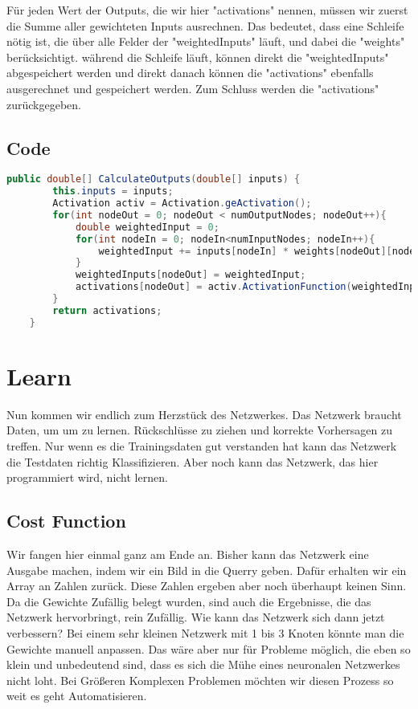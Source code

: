 \documentclass[12pt]{article}
\begin{document}
Für jeden Wert der Outputs, die wir hier "activations" nennen, müssen wir zuerst die Summe aller gewichteten Inputs ausrechnen. Das bedeutet, dass eine Schleife nötig ist, die über alle Felder der "weightedInputs" läuft, und dabei die "weights" berücksichtigt. während die Schleife läuft, können direkt die "weightedInputs" abgespeichert werden und direkt danach können die "activations" ebenfalls ausgerechnet und gespeichert werden. Zum Schluss werden die "activations" zurückgegeben.\subsection{ Code}\begin{lstlisting}[language=Java]
    public double[] CalculateOutputs(double[] inputs) {
        this.inputs = inputs;
        Activation activ = Activation.geActivation();
        for(int nodeOut = 0; nodeOut < numOutputNodes; nodeOut++){
            double weightedInput = 0;
            for(int nodeIn = 0; nodeIn<numInputNodes; nodeIn++){
                weightedInput += inputs[nodeIn] * weights[nodeOut][nodeIn];
            }
            weightedInputs[nodeOut] = weightedInput;
            activations[nodeOut] = activ.ActivationFunction(weightedInput);
        }
        return activations;
    }
\end{lstlisting}\section{ Learn}Nun kommen wir endlich zum Herzstück des Netzwerkes. Das Netzwerk braucht Daten, um um zu lernen. Rückschlüsse zu ziehen und korrekte Vorhersagen zu treffen. Nur wenn es die Trainingsdaten gut verstanden hat kann das Netzwerk die Testdaten richtig Klassifizieren. Aber noch kann das Netzwerk, das hier programmiert wird, nicht lernen.\subsection{ Cost Function}Wir fangen hier einmal ganz am Ende an. Bisher kann das Netzwerk eine Ausgabe machen, indem wir ein Bild in die Querry geben. Dafür erhalten wir ein Array an Zahlen zurück. Diese Zahlen ergeben aber noch überhaupt keinen Sinn. Da die Gewichte Zufällig belegt wurden, sind auch die Ergebnisse, die das Netzwerk hervorbringt, rein Zufällig. 
Wie kann das Netzwerk sich dann jetzt verbessern? Bei einem sehr kleinen Netzwerk mit 1 bis 3 Knoten könnte man die Gewichte manuell anpassen. Das wäre aber nur für Probleme möglich, die eben so klein und unbedeutend sind, dass es sich die Mühe eines neuronalen Netzwerkes nicht loht. Bei Größeren Komplexen Problemen möchten wir diesen Prozess so weit es geht Automatisieren.
\end{document}

